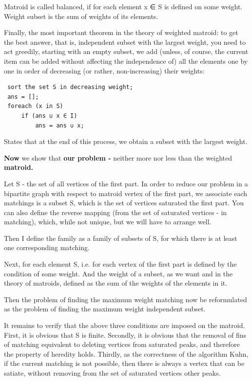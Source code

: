 Matroid is called balanced, if for each element x ∈ S is defined on some weight. Weight subset is the sum of weights of its elements.

Finally, the most important theorem in the theory of weighted matroid: to get the best answer, that is, independent subset with the largest weight, you need to act greedily, starting with an empty subset, we add (unless, of course, the current item can be added without affecting the independence of) all the elements one by one in order of decreasing (or rather, non-increasing) their weights:

\begin{verbatim}
 sort the set S in decreasing weight;
 ans = [];
 foreach (x in S)
     if (ans ∪ x ∈ I)
         ans = ans ∪ x; 
\end{verbatim}
States that at the end of this process, we obtain a subset with the largest weight.

\textbf{Now} we show that \textbf{our problem -} neither more nor less than the weighted \textbf{matroid.}

Let S - the set of all vertices of the first part. In order to reduce our problem in a bipartite graph with respect to matroid vertex of the first part, we associate each matchings is a subset S, which is the set of vertices saturated the first part. You can also define the reverse mapping (from the set of saturated vertices - in matching), which, while not unique, but we will have to arrange well.

Then I define the family as a family of subsets of S, for which there is at least one corresponding matching.

Next, for each element S, i.e. for each vertex of the first part is defined by the condition of some weight. And the weight of a subset, as we want and in the theory of matroids, defined as the sum of the weights of the elements in it.

Then the problem of finding the maximum weight matching now be reformulated as the problem of finding the maximum weight independent subset.

It remains to verify that the above three conditions are imposed on the matroid. First, it is obvious that S is finite. Secondly, it is obvious that the removal of fins of matching equivalent to deleting vertices from saturated peaks, and therefore the property of heredity holds. Thirdly, as the correctness of the algorithm Kuhn, if the current matching is not possible, then there is always a vertex that can be satiate, without removing from the set of saturated vertices other peaks.

